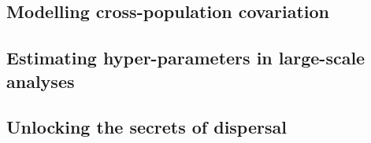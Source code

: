 \documentclass[
]{book}
\begin{document}
\hypertarget{modelling-cross-population-covariation}{%
\subsection{Modelling cross-population covariation}\label{modelling-cross-population-covariation}}

\hypertarget{estimating-hyper-parameters-in-large-scale-analyses}{%
\subsection{Estimating hyper-parameters in large-scale analyses}\label{estimating-hyper-parameters-in-large-scale-analyses}}

\hypertarget{unlocking-the-secrets-of-dispersal}{%
\subsection{Unlocking the secrets of dispersal}\label{unlocking-the-secrets-of-dispersal}}

  
\end{document}
